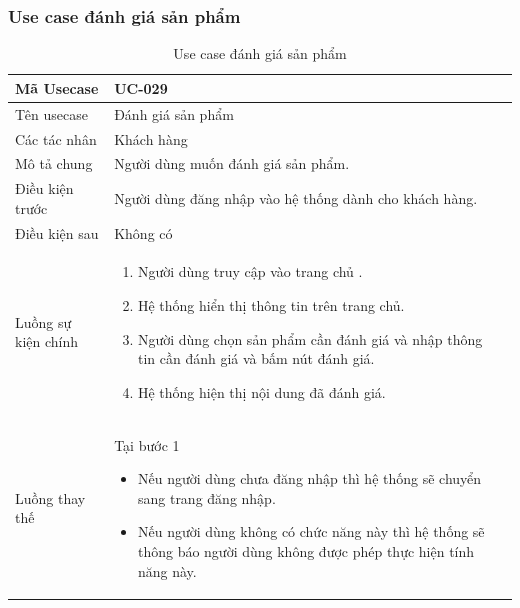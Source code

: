 \documentclass[12pt,a4paper]{article}
\begin{document}
    \subsubsection*{Use case đánh giá sản phẩm}
    \begin{table}[H]
        \centering
        \begin{tabular}{|p{3.5cm}|p{11.5cm}|c|}
            \hline
            Mã Usecase      & UC-029                                                 \\
            \hline
            Tên usecase     & Đánh giá sản phẩm                                      \\
            \hline
            Các tác nhân    & Khách hàng                                             \\
            \hline
            Mô tả chung     & Người dùng muốn đánh giá sản phẩm.                     \\
            \hline

            Điều kiện trước & Người dùng đăng nhập vào hệ thống dành cho khách hàng. \\
            \hline

            Điều kiện sau   & Không có                                               \\
            \hline

            Luồng sự kiện chính & \vspace{-.8cm}\begin{enumerate}
                                                    \item Người dùng truy cập vào trang chủ .
                                                    \item Hệ thống hiển thị thông tin trên trang chủ.
                                                    \item Người dùng chọn sản phẩm cần đánh giá và nhập thông tin cần đánh giá và bấm nút đánh giá.
                                                    \item Hệ thống hiện thị nội dung đã đánh giá.
            \end{enumerate}
            \\
            \hline
            Luồng thay thế & Tại bước 1\newline
            \vspace{-.8cm}\begin{itemize}
                              \item Nếu người dùng chưa đăng nhập thì hệ thống sẽ chuyển sang trang đăng nhập.
                              \item Nếu người dùng không có chức năng này thì hệ thống sẽ thông báo người dùng không được phép thực hiện tính năng này.
            \end{itemize}

            \\ \hline
        \end{tabular}
        \caption{Use case đánh giá sản phẩm}

    \end{table}
\end{document}
